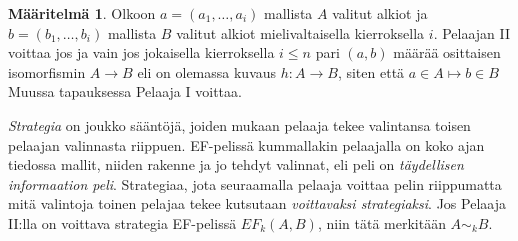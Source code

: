 \documentclass[finnish]{tktltiki2}
\theoremstyle{definition}
\newtheorem{maar}[lau]{Määritelmä}
\theoremstyle{remark}
\begin{document}
\begin{maar}
Olkoon $a = (a_1, \ldots, a_i)$ mallista $A$ valitut alkiot ja $b = (b_1, \ldots, b_i)$ mallista $B$ valitut alkiot mielivaltaisella kierroksella $i$. Pelaajan II voittaa jos ja vain jos jokaisella kierroksella $i \leq n$ pari $(a, b)$ määrää osittaisen isomorfismin $A \rightarrow B$ eli on olemassa kuvaus $h: A \rightarrow B$, siten että $a \in A \mapsto b \in B$ Muussa tapauksessa Pelaaja I voittaa.
\end{maar}

\textit{Strategia} on joukko sääntöjä, joiden mukaan pelaaja tekee valintansa toisen pelaajan valinnasta riippuen. EF-pelissä kummallakin pelaajalla on koko ajan tiedossa mallit, niiden rakenne ja jo tehdyt valinnat, eli peli on \textit{täydellisen informaation peli}. Strategiaa, jota seuraamalla pelaaja voittaa pelin riippumatta mitä valintoja toinen pelajaa tekee kutsutaan \textit{voittavaksi strategiaksi}. Jos Pelaaja II:lla on voittava strategia EF-pelissä $EF_k(A, B)$, niin tätä merkitään $A \sim_k B$.
\end{document}
